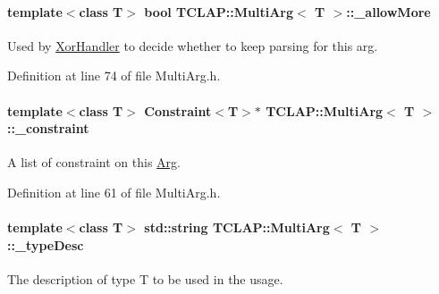 \paragraph[{\texorpdfstring{\+\_\+allow\+More}{_allowMore}}]{\setlength{\rightskip}{0pt plus 5cm}template$<$class T$>$ bool {\bf T\+C\+L\+A\+P\+::\+Multi\+Arg}$<$ T $>$\+::\+\_\+allow\+More\hspace{0.3cm}{\ttfamily [protected]}}\hypertarget{classTCLAP_1_1MultiArg_a93a3ef586f763d46839c0e737689b85f}{}\label{classTCLAP_1_1MultiArg_a93a3ef586f763d46839c0e737689b85f}
Used by \hyperlink{classTCLAP_1_1XorHandler}{Xor\+Handler} to decide whether to keep parsing for this arg. 

Definition at line 74 of file Multi\+Arg.\+h.

\paragraph[{\texorpdfstring{\+\_\+constraint}{_constraint}}]{\setlength{\rightskip}{0pt plus 5cm}template$<$class T$>$ {\bf Constraint}$<$T$>$$\ast$ {\bf T\+C\+L\+A\+P\+::\+Multi\+Arg}$<$ T $>$\+::\+\_\+constraint\hspace{0.3cm}{\ttfamily [protected]}}\hypertarget{classTCLAP_1_1MultiArg_afc754048b66bc3a251268947273ea906}{}\label{classTCLAP_1_1MultiArg_afc754048b66bc3a251268947273ea906}
A list of constraint on this \hyperlink{classTCLAP_1_1Arg}{Arg}. 

Definition at line 61 of file Multi\+Arg.\+h.

\paragraph[{\texorpdfstring{\+\_\+type\+Desc}{_typeDesc}}]{\setlength{\rightskip}{0pt plus 5cm}template$<$class T$>$ std\+::string {\bf T\+C\+L\+A\+P\+::\+Multi\+Arg}$<$ T $>$\+::\+\_\+type\+Desc\hspace{0.3cm}{\ttfamily [protected]}}\hypertarget{classTCLAP_1_1MultiArg_a0f6a2b04fe15d1ede95165fc6e1949e8}{}\label{classTCLAP_1_1MultiArg_a0f6a2b04fe15d1ede95165fc6e1949e8}
The description of type T to be used in the usage. 

